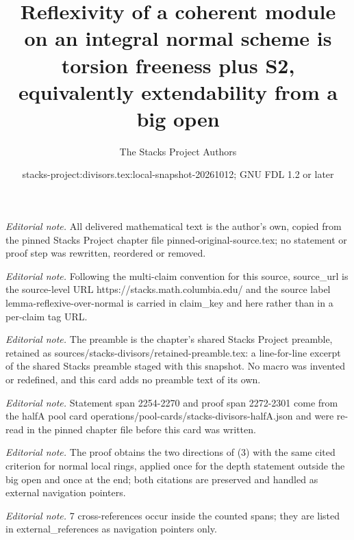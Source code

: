 \documentclass[10pt,a4paper]{amsart}
\title{Reflexivity of a coherent module on an integral normal scheme is torsion freeness plus S2, equivalently extendability from a big open}
\author{The Stacks Project Authors}
\date{stacks-project:divisors.tex:local-snapshot-20261012; GNU FDL 1.2 or later}
\theoremstyle{plain}
\theoremstyle{definition}
\theoremstyle{remark}
\numberwithin{equation}{subsection}
\begin{document}
\maketitle
\noindent\textit{Editorial note.} All delivered mathematical text is the author's own, copied from the pinned Stacks Project chapter file pinned-original-source.tex; no statement or proof step was rewritten, reordered or removed.\par\medskip
\noindent\textit{Editorial note.} Following the multi-claim convention for this source, source\_url is the source-level URL https://stacks.math.columbia.edu/ and the source label lemma-reflexive-over-normal is carried in claim\_key and here rather than in a per-claim tag URL.\par\medskip
\noindent\textit{Editorial note.} The preamble is the chapter's shared Stacks Project preamble, retained as sources/stacks-divisors/retained-preamble.tex: a line-for-line excerpt of the shared Stacks preamble staged with this snapshot. No macro was invented or redefined, and this card adds no preamble text of its own.\par\medskip
\noindent\textit{Editorial note.} Statement span 2254-2270 and proof span 2272-2301 come from the halfA pool card operations/pool-cards/stacks-divisors-halfA.json and were re-read in the pinned chapter file before this card was written.\par\medskip
\noindent\textit{Editorial note.} The proof obtains the two directions of (3) with the same cited criterion for normal local rings, applied once for the depth statement outside the big open and once at the end; both citations are preserved and handled as external navigation pointers.\par\medskip
\noindent\textit{Editorial note.} 7 cross-references occur inside the counted spans; they are listed in external\_references as navigation pointers only.\par\medskip
\end{document}
